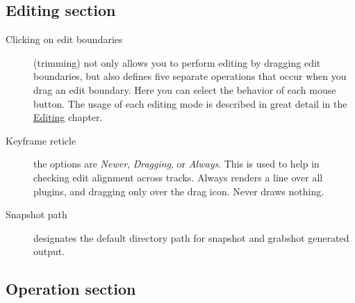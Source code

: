 \subsection{Editing section}%
\label{sub:editing_section}

\begin{description}
    \item[Clicking on edit boundaries] (trimming) \CGG{} not only allows you to perform editing by dragging edit boundaries, but also defines five separate operations that occur when you drag an edit boundary. Here you can select the behavior of each mouse button. The usage of each editing mode is described in great detail in the \hyperref[sub:drag_handle_management_trimming]{Editing} chapter.
    \item[Keyframe reticle] the options are \textit{Newer}, \textit{Dragging}, or \textit{Always}. This is used to help in checking edit alignment across tracks.  Always renders a line over all plugins, and dragging only over the drag icon. Never draws nothing.
    \item[Snapshot path] designates the default directory path for snapshot and grabshot generated output.
\end{description}

\subsection{Operation section}%
\label{sub:operation_section}

